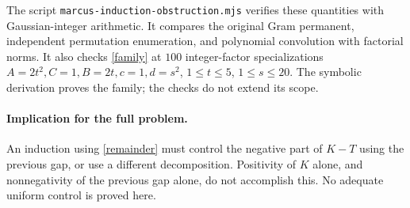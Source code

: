 \documentclass[11pt]{article}
\begin{document}
The script \texttt{marcus-induction-obstruction.mjs} verifies these
quantities with Gaussian-integer arithmetic. It compares the original Gram
permanent, independent permutation enumeration, and polynomial convolution
with factorial norms. It also checks \eqref{family} at $100$ integer-factor
specializations $A=2t^2,C=1,B=2t,c=1,d=s^2$, $1\le t\le5$,
$1\le s\le20$. The symbolic derivation proves the family; the checks
do not extend its scope.

\paragraph{Implication for the full problem.}
An induction using \eqref{remainder} must control the negative part of
$K-T$ using the previous gap, or use a different decomposition. Positivity
of $K$ alone, and nonnegativity of the previous gap alone, do not accomplish
this. No adequate uniform control is proved here.
\end{document}
